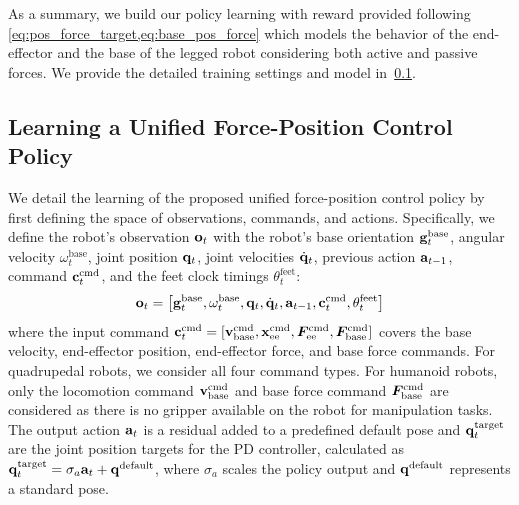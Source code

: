\documentclass{article}
\begin{document}
 As a summary, we build our policy learning with reward provided following \cref{eq:pos_force_target,eq:base_pos_force} which models the behavior of the end-effector and the base of the legged robot considering both active and passive forces. We provide the detailed training settings and model in~\cref{sec:learning}.
 

\subsection{Learning a Unified Force-Position Control Policy} \label{sec:learning}

We detail the learning of the proposed unified force-position control policy by first defining the space of observations, commands, and actions.
Specifically, we define the robot's observation ${\mathbf{o}}_t$ with the robot's base orientation ${\mathbf{g}}^{\text{base}}_t$, angular velocity $\omega^{\text{base}}_t$, joint position ${\mathbf{q}}_t$, joint velocities $\dot{{\mathbf{q}}}_t$, previous action ${\mathbf{a}}_{t-1}$, command ${\mathbf{c}}^{\text{cmd}}_t$, and the feet clock timings $\theta^{\text{feet}}_t$: 
\begin{equation}
{\mathbf{o}}_t = \left[{\mathbf{g}}^{\text{base}}_t, {\mathbf{\omega}}^{\text{base}}_t, {\mathbf{q}}_t, \dot{{\mathbf{q}}}_t, {\mathbf{a}}_{t-1}, {\mathbf{c}}^{\text{cmd}}_t, {\mathbf{\theta}}^{\text{feet}}_t \right]
\end{equation}
where the input command ${\mathbf{c}}^{\text{cmd}}_t = [{\mathbf{v}}_{\text{base}}^{\text{cmd}}, {\mathbf{x}}_{\text{ee}}^{\text{cmd}}, {\bm{F}}_{\text{ee}}^{\text{cmd}}, {\bm{F}}_{\text{base}}^{\text{cmd}}]$ covers the base velocity, end-effector position, end-effector force, and base force commands. For quadrupedal robots, we consider all four command types. For humanoid robots, only the locomotion command ${\mathbf{v}}^{\text{cmd}}_{\text{base}}$ and base force command ${\bm{F}}^{\text{cmd}}_{\text{base}}$ are considered as there is no gripper available on the robot for manipulation tasks. The output action ${\mathbf{a}}_t$ is a residual added to a predefined default pose and ${\mathbf{q}}^{\text{target}}_t$ are the joint position targets for the PD controller, calculated as 
${\mathbf{q}}^{\text{target}}_t = \sigma_a {\mathbf{a}}_t + {\mathbf{q}}^{\text{default}}$,
where $\sigma_a$ scales the policy output and ${\mathbf{q}}^{\text{default}}$ represents a standard pose. 
\end{document}
